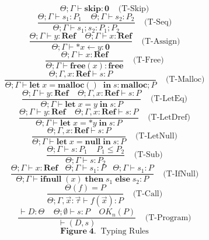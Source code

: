 \documentclass[english]{jssst_ppl} %
\newcommand\LET{\mathbf{let}\;}
\newcommand\IN{\mathbf{in}\;}
\newcommand\SKIP{\mathbf{skip}}
\newcommand\Rtab{\; \; \; \;}
\newcommand\IFNULL{\mathbf{ifnull}\;}
\newcommand\THEN{\mathbf{then}\;}
\newcommand\ELSE{\mathbf{else}\;}
\newcommand\MALLOC{\mathbf{malloc()}\;}
\newcommand\Malloc{\mathbf{malloc}}
\newcommand\Free{\mathbf{free}}
\begin{document}
$$
         \Theta ; \Gamma \vdash \SKIP : \mathbf{0}
      \Rtab \mbox{(T-Skip)}
$$
$$
      \frac{\Theta ; \Gamma \vdash s_{1} : P_{1} \Rtab \Theta ; \Gamma \vdash s_{2} : P_{2}}
          {\Theta ; \Gamma \vdash s_{1} ; s_{2} : P_{1};P_{2} }
     \Rtab \mbox{(T-Seq)}
$$
$$
     \frac{\Theta ; \Gamma \vdash y :  \mathbf{Ref} \Rtab \Theta ; \Gamma \vdash x : \mathbf{Ref} }
          {\Theta ; \Gamma \vdash *x \leftarrow y : \mathbf{0} }
     \Rtab \mbox{(T-Assign)}
$$
$$
     \frac{\Theta ; \Gamma \vdash x : \mathbf{Ref} }
           {\Theta ; \Gamma \vdash \Free(x) : \Free}
     \Rtab \mbox{(T-Free)}
$$
$$
     \frac{\Theta ; \Gamma,x : \mathbf{Ref} \vdash s : P}
           {\Theta ; \Gamma \vdash \LET x = \MALLOC \; \IN s  : \Malloc;P}
           \Rtab \mbox{(T-Malloc)}
$$
$$
     \frac{\Theta ; \Gamma \vdash y : \mathbf{Ref}  \Rtab \Theta ; \Gamma , x : \mathbf{Ref} \vdash s : P}
           {\Theta ; \Gamma \vdash \LET x = y \; \IN s : P}
     \Rtab \mbox{(T-LetEq)}
$$
$$
     \frac{\Theta ; \Gamma \vdash y : \mathbf{Ref}  \Rtab \Theta ; \Gamma , x : \mathbf{Ref} \vdash s : P}
           {\Theta ; \Gamma \vdash \LET x = *y \; \IN s : P}
     \Rtab \mbox{(T-LetDref)}
$$
$$
     \frac{\Theta ; \Gamma, x : \mathbf{Ref} \vdash s : P}
           {\Theta ; \Gamma \vdash \LET x = \mathbf{null} \; \IN s : P}
     \Rtab \mbox{(T-LetNull)}
$$
$$
     \frac{\Theta ; \Gamma \vdash s : P_{1} \Rtab P_{1} \le P_{2}}
            {\Theta ; \Gamma \vdash s : P_{2}}
     \Rtab \mbox{(T-Sub)}
$$
$$
     \frac{\Theta ; \Gamma \vdash x : \mathbf{Ref}   \ \ \ \  \Theta ; \Gamma \vdash s_{1} : P \ \ \ \ \Theta ; \Gamma \vdash s_{1} : P}
           {\Theta ; \Gamma \vdash \IFNULL(x) \; \THEN s_{1}\; \ELSE s_{2} : P}
     \Rtab \mbox{(T-IfNull)}
$$
$$ \frac{ \Theta(f) = P}
{\Theta; \Gamma, \vec{x} : \vec{\tau} \vdash f(\vec{x}) : P}
\Rtab \mbox{(T-Call)} $$
$$\frac{\vdash D : \Theta \;\;\;\; \Theta; \emptyset\vdash s : P \Rtab OK_{n}(P)}
{\vdash (D, s)}
\Rtab \mbox{(T-Program)} $$
$$
    \mathbf{Figure \; 4.} \;\;\mbox{Typing Rules}
$$
\end{document}
